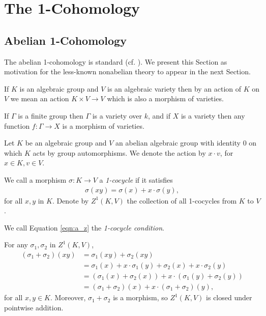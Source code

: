
\chapter{The 1-Cohomology}
\label{Chapter3}

\section{Abelian 1-Cohomology}
The abelian 1-cohomology is standard (cf. \cite{brown1982cohomology}). We present this Section as motivation for the less-known nonabelian theory to appear in the next Section.

If $K$ is an algebraic group and $V$ is an algebraic variety then by an action of $K$ on $V$ we mean an action $K\times V\rightarrow V$ which is also a morphism of varieties.

If $\Gamma$ is a finite group then $\Gamma$ is a variety over $k$, and if $X$ is a variety then any function $f:\Gamma \rightarrow X$ is a morphism of varieties.

Let $K$ be an algebraic group and $V$ an abelian algebraic group with identity $0$ on which $K$ acts by group automorphisms. We denote the action by $x \cdot v$, for $x \in K, v \in V$.

\begin{definition} We call a morphism $\sigma: K\rightarrow V$ a \emph{1-cocycle} if it satisfies
	\begin{align}
		\sigma(xy) = \sigma(x) + x\cdot\sigma(y),
		\label{eqn:a_z}
	\end{align}
	for all $x, y$ in $K$. Denote by $Z^1\left( K, V \right)$ the collection of all 1-cocycles from $K$ to $V$.

	We call Equation \ref{eqn:a_z} the \emph{1-cocycle condition}.
\end{definition}

For any $\sigma_1, \sigma_2$ in $Z^1\left(K, V\right)$,
\begin{align*}
	\left(\sigma_1 + \sigma_2\right)(xy) &=  \sigma_1(xy) +  \sigma_2(xy) \\
	&=  \sigma_1(x) + x\cdot\sigma_1(y) +  \sigma_2(x) + x\cdot\sigma_2(y)\\
	&=  \left( \sigma_1(x) + \sigma_2(x) \right) + x\cdot\left(\sigma_1(y) + \sigma_2(y)\right) \\
	&=  \left(\sigma_1+\sigma_2\right)(x) + x\cdot\left(\sigma_1 + \sigma_2\right)(y),
\end{align*}
for all $x,y \in K$. Moreover, $\sigma_1 + \sigma_2$ is a morphism, so $Z^1(K, V)$ is closed under pointwise addition.

